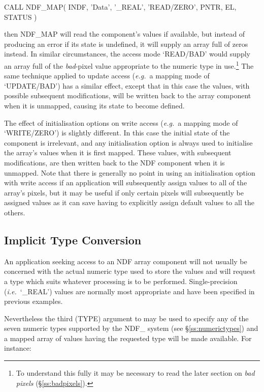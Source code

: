 \documentclass[twoside,11pt,nolof]{starlink}
\providecommand{\st}[1]{{\emph{#1}}}
\begin{document}
\small
\begin{terminalv}
      CALL NDF_MAP( INDF, 'Data', '_REAL', 'READ/ZERO', PNTR, EL, STATUS )
\end{terminalv}
\normalsize

then NDF\_MAP will read the component's values if available, but instead of
producing an error if its state is undefined, it will supply an array full
of zeros instead.
In similar circumstances, the access mode `READ/BAD' would supply an array
full of the \st{bad\/}-pixel value appropriate to the numeric type in
use.\footnote{To understand this fully it may be necessary to read the later
section on \st{bad pixels\/} (\S\ref{ss:badpixels}).}
The same technique applied to update access (\st{e.g.}\ a mapping mode of
`UPDATE/BAD') has a similar effect, except that in this case the values, with
possible subsequent modifications, will be written back to the array component
when it is unmapped, causing its state to become defined.

The effect of initialisation options on write access (\st{e.g.}\ a mapping
mode of `WRITE/ZERO') is slightly different.
In this case the initial state of the component is irrelevant, and any
initialisation option is always used to initialise the array's values when
it is first mapped.
These values, with subsequent modifications, are then written back to the
NDF component when it is unmapped.
Note that there is generally no point in using an initialisation option with
write access if an application will subsequently assign values to all of
the array's pixels, but it may be useful if only certain pixels will
subsequently be assigned values as it can save having to explicitly assign
default values to all the others.

\subsection{\label{ss:implicitconversion}Implicit Type Conversion}

An application seeking access to an NDF array component will not usually be
concerned with the actual numeric type used to store the values and will
request a type which suits whatever processing is to be performed.
Single-precision (\st{i.e.}\ `\_REAL') values are normally most appropriate and
have  been specified in previous examples.

Nevertheless the third (TYPE) argument to  may be used to specify any
of the seven numeric types supported by the NDF\_ system (see
\S\ref{ss:numerictypes}) and a mapped array of values having the requested
type will be made available.
For instance:
\end{document}
